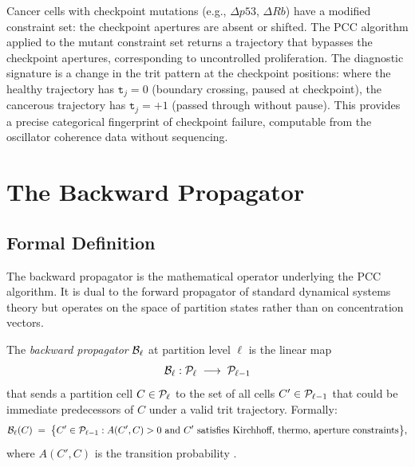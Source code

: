 \begin{remark}
Cancer cells with checkpoint mutations (e.g., $\Delta p53$, $\Delta Rb$) have
a modified constraint set: the checkpoint apertures are absent or shifted.
The PCC algorithm applied to the mutant constraint set returns a trajectory
that bypasses the checkpoint apertures, corresponding to uncontrolled
proliferation.  The diagnostic signature is a change in the trit pattern at
the checkpoint positions: where the healthy trajectory has $\mathtt{t}_j = 0$
(boundary crossing, paused at checkpoint), the cancerous trajectory has
$\mathtt{t}_j = +1$ (passed through without pause).  This provides a precise
categorical fingerprint of checkpoint failure, computable from the oscillator
coherence data without sequencing.
\end{remark}

\section{The Backward Propagator}
\label{sec:backward-propagator}

\subsection{Formal Definition}

The backward propagator is the mathematical operator underlying the PCC
algorithm.  It is dual to the forward propagator of standard dynamical
systems theory but operates on the space of partition states rather than on
concentration vectors.

\begin{definition}
\label{def:backward-propagator}
The \emph{backward propagator} $\mathcal{B}_\ell$ at partition level $\ell$ is the
linear map
\begin{equation}
    \mathcal{B}_\ell : \mathcal{P}_\ell \;\longrightarrow\; \mathcal{P}_{\ell-1}
\end{equation}
that sends a partition cell $C \in \mathcal{P}_\ell$ to the set of all cells
$C' \in \mathcal{P}_{\ell-1}$ that could be immediate predecessors of $C$ under
a valid trit trajectory.  Formally:
\begin{equation}
    \mathcal{B}_\ell(C)
    \;=\;
    \bigl\{ C' \in \mathcal{P}_{\ell-1} :
    A(C', C) > 0 \text{ and } C' \text{ satisfies Kirchhoff, thermo, aperture constraints}
    \bigr\},
\end{equation}
where $A(C', C)$ is the transition probability .
\end{definition}

